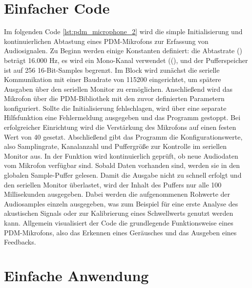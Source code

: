 {
	\label{lst:pdm_microphone_1}
}

\section{Einfacher Code}

Im folgenden Code \ref{lst:pdm_microphone_2} wird die simple Initialisierung und kontinuierlichen Abtastung eines PDM-Mikrofons zur Erfassung von Audiosignalen. Zu Beginn werden einige Konstanten definiert: die Abtastrate () beträgt 16.000 Hz, es wird ein Mono-Kanal verwendet ((), und der Pufferspeicher ist auf 256 16-Bit-Samples begrenzt.
Im Block  wird zunächst die serielle Kommunikation mit einer Baudrate von 115200 eingerichtet, um spätere Ausgaben über den seriellen Monitor zu ermöglichen. Anschließend wird das Mikrofon über die PDM-Bibliothek mit den zuvor definierten Parametern konfiguriert. Sollte die Initialisierung fehlschlagen, wird über eine separate Hilfsfunktion eine Fehlermeldung ausgegeben und das Programm gestoppt. Bei erfolgreicher Einrichtung wird die Verstärkung des Mikrofons auf einen festen Wert von 40 gesetzt. Abschließend gibt das Programm die Konfigurationswerte, also Samplingrate, Kanalanzahl und Puffergröße zur Kontrolle im seriellen Monitor aus.
In der Funktion  wird kontinuierlich geprüft, ob neue Audiodaten vom Mikrofon verfügbar sind. Sobald Daten vorhanden sind, werden sie in den globalen Sample-Puffer gelesen. Damit die Ausgabe nicht zu schnell erfolgt und den seriellen Monitor überlastet, wird der Inhalt des Puffers nur alle 100 Millisekunden ausgegeben. Dabei werden die aufgenommenen Rohwerte der Audiosamples einzeln ausgegeben, was zum Beispiel für eine erste Analyse des akustischen Signals oder zur Kalibrierung eines Schwellwerts genutzt werden kann.
Allgemein visualisiert der Code die grundlegende Funktionsweise eines PDM-Mikrofons, also das Erkennen eines Geräusches und das Ausgeben eines Feedbacks.

{
	\label{lst:pdm_microphone_2}
}

\section{Einfache Anwendung}

